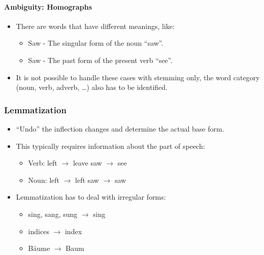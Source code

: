 				\paragraph{Ambiguity: Homographs} %
					\begin{itemize}
						\item There are words that have different meanings, like:
							\begin{itemize}
								\item Saw - The singular form of the noun \enquote{saw}.
								\item Saw - The past form of the present verb \enquote{see}.
							\end{itemize}
						\item It is not possible to handle these cases with stemming only, the word category (noun, verb, adverb, \dots) also has to be identified.
					\end{itemize}

			\subsubsection{Lemmatization} %
				\begin{itemize}
					\item \enquote{Undo} the inflection changes and determine the actual base form.
					\item This typically requires information about the part of speech:
						\begin{itemize}
							\item Verb: \tabto{1.5cm} left \(\rightarrow\) leave \tabto{5cm} saw \(\rightarrow\) see
							\item Noun: \tabto{1.5cm} left \(\rightarrow\) left  \tabto{5cm} saw \(\rightarrow\) saw
						\end{itemize}
					\item Lemmatization has to deal with irregular forms:
						\begin{itemize}
							\item sing, sang, sung \(\rightarrow\) sing
							\item indices \(\rightarrow\) index
							\item Bäume \(\rightarrow\) Baum
						\end{itemize}
				\end{itemize}

